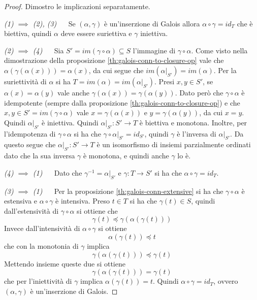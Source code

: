 \documentclass[12pt]{article}
\numberwithin{theorem}{subsection}
\begin{document}
\begin{proof}
	Dimostro le implicazioni separatamente.
	
	\textit{(1) $\implies$ (2), (3)} $\quad$ Se $(\alpha, \gamma)$ è un'inserzione di Galois allora $\alpha \circ \gamma = id_T$ che è biettiva, quindi $\alpha$ deve essere suriettiva e $\gamma$ iniettiva.
	
	\textit{(2) $\implies$ (4)} $\quad$ Sia $S' = im(\gamma \circ \alpha) \subseteq S$ l'immagine di $\gamma \circ \alpha$. Come visto nella dimostrazione della proposizione \ref{th:galois-conn-to-closure-op} vale che $\alpha(\gamma(\alpha(x))) = \alpha(x)$, da cui segue che $im( \left. \alpha \right|_{S'}) = im(\alpha)$. Per la suriettività di $\alpha$ si ha $T = im(\alpha) = im( \left. \alpha \right|_{S'})$.
	Presi $x, y \in S'$, se $\alpha(x) = \alpha(y)$ vale anche $\gamma(\alpha(x)) = \gamma(\alpha(y))$. Dato però che $\gamma \circ \alpha$ è idempotente (sempre dalla proposizione \ref{th:galois-conn-to-closure-op}) e che $x, y \in S' = im(\gamma \circ \alpha)$ vale $x = \gamma(\alpha(x))$ e $y = \gamma(\alpha(y))$, da cui $x = y$. Quindi $\left. \alpha \right|_{S'}$ è iniettiva.
	Quindi $\left. \alpha \right|_{S'} : S' \rightarrow T$ è  biettiva e monotona. Inoltre, per l'idempotenza di $\gamma \circ \alpha$ si ha che $\left. \gamma \circ \alpha \right|_{S'} = id_{S'}$, quindi $\gamma$ è l'inversa di $\left. \alpha \right|_{S'}$.
	Da questo segue che $\left. \alpha \right|_{S'}: S' \rightarrow T$ è un isomorfismo di insiemi parzialmente ordinati dato che la sua inversa $\gamma$ è monotona, e quindi anche $\gamma$ lo è.
	
	\textit{(4) $\implies$ (1)} $\quad$ Dato che $\gamma^{-1} = \left. \alpha \right|_{S'}$ e $\gamma: T \rightarrow S'$ si ha che $\alpha \circ \gamma = id_T$.
	
	
	\textit{(3) $\implies$ (1)} $\quad$ Per la proposizione \ref{th:galois-conn-extensive} si ha che $\gamma \circ \alpha$ è estensiva e $\alpha \circ \gamma$ è intensiva. Preso $t \in T$ si ha che $\gamma(t) \in S$, quindi dall'estensività di $\gamma \circ \alpha$ si ottiene che
	\[
	\gamma(t) \preceq \gamma(\alpha(\gamma(t)))
	\]
	Invece dall'intensività di $\alpha \circ \gamma$ si ottiene
	\[
	\alpha(\gamma(t)) \preceq t
	\]
	che con la monotonia di $\gamma$ implica
	\[
	\gamma(\alpha(\gamma(t))) \preceq \gamma(t)
	\]
	Mettendo insieme queste due si ottiene
	\[
	\gamma(\alpha(\gamma(t))) = \gamma(t)
	\]
	che per l'iniettività di $\gamma$ implica $\alpha(\gamma(t)) = t$. Quindi $\alpha \circ \gamma = id_T$, ovvero $(\alpha, \gamma)$ è un'inserzione di Galois.
\end{proof}
\end{document}

